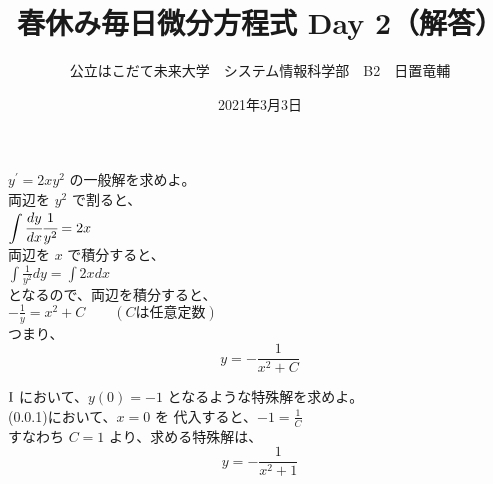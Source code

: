 \documentclass[dvipdfmx,uplatex]{jsarticle}
\title{春休み毎日微分方程式 Day 2（解答）}
\author{公立はこだて未来大学　システム情報科学部　B2　日置竜輔}
\date{2021年3月3日}
\begin{document}
\begin{spacing}{1.6}
\maketitle

\begin{qparts}
    \qpart $ y ^ {\prime} = 2xy ^ 2 $ の一般解を求めよ。\\
    両辺を $ y ^ 2 $ で割ると、\\
    $ \displaystyle \int \cfrac{dy}{dx} \cfrac{1}{y ^ 2} = 2x $ \\
    両辺を $ x $ で積分すると、\\
    $ \displaystyle \int \frac{1}{y ^ 2}dy = \int 2xdx $ \\
    となるので、両辺を積分すると、\\
    $ \displaystyle -\frac{1}{y} = x ^ 2 + C \qquad (Cは任意定数) $ \\
    つまり、
    \begin{equation}
      y = -\frac{1}{x ^ 2 + C} \nonumber
    \end{equation}

    \qpart $\rm I $ において、$ y(0) = -1 $ となるような特殊解を求めよ。\\
    (0.0.1)において、$ x = 0 $ を 代入すると、$ \displaystyle -1 = \frac{1}{C}$ \\
    すなわち $ C = 1$ より、求める特殊解は、
    \begin{equation}
      y = -\frac{1}{x ^ 2 + 1} \nonumber
    \end{equation}
\end{qparts}
\end{spacing}
\end{document}
